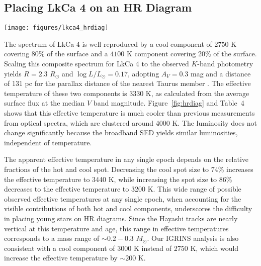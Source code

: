 \documentclass[12pt]{report}
\begin{document}
\subsection{Placing LkCa 4 on an HR Diagram}

\begin{figure*}
 \centering
 \texttt{[image: figures/lkca4\_hrdiag]}
 \caption[Locations for LkCa 4 on an HR diagram]{Locations for LkCa 4 on an HR diagram, compared with models of pre-main sequence evolution calculated by \citet{baraffe15} with isochrones (black lines) and evolution models of a single mass (dashed blue lines) as marked.  The measured effective temperature and luminosity from this paper, based on the two-component fit and a median $V$-band magnitude, corresponds to the black asterisk.  The yellow shaded region corresponds to the range of apparent effective temperatures that are would be measured as the hot component rotates into and out of our view.  The blue circle corresponds to the measurement at blue-optical wavelengths by \citet{donati14}, the purple square corresponds to the measurement from low-resolution optical spectra, biased to TiO band strengths, by \citet[][biased to]{herczeg14}, while the red diamond corresponds to what we would measure from the K-band spectrum and 2MASS $J$-band magnitude.}
 \label{fig:hrdiag}
\end{figure*}

The spectrum of LkCa 4 is well reproduced by a cool component of $2750$ K covering 80\% of the surface and a $4100$ K component covering 20\% of the surface.   Scaling this composite spectrum for LkCa 4 to the observed $K$-band photometry yields $R=2.3$ $R_\odot$ and $\log L/L_\odot=0.17$, adopting $A_V=0.3$ mag and a distance of 131 pc for the parallax distance of the nearest Taurus member \citep{torres12}.  The effective temperature of these two components is 3330 K, as calculated from the average surface flux at the median $V$ band magnitude.  Figure~\ref{fig:hrdiag} and Table~4 shows that this effective temperature is much cooler than previous measurements from optical spectra, which are clustered around 4000 K.  The luminosity does not change significantly because the broadband SED yields similar luminosities, independent of temperature.

The apparent effective temperature in any single epoch depends on the relative fractions of the hot and cool spot.  Decreasing the cool spot size to 74\% increases the effective temperature to 3440 K, while increasing the spot size to 86\% decreases to the effective temperature to 3200 K.  This wide range of possible observed effective temperatures at any single epoch, when accounting for the visible contributions of both hot and cool components, underscores the difficulty in placing young stars on HR diagrams.  
Since the Hayashi tracks are nearly vertical at this temperature and age, this range in effective temperatures corresponds to a mass range of $\sim 0.2-0.3$ $M_\odot$.  Our IGRINS analysis is also consistent with a cool component of 3000 K instead of 2750 K, which would increase the effective temperature by $\sim 200$ K.  
\end{document}
